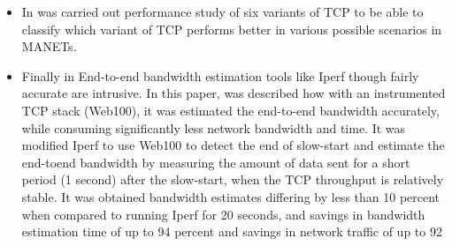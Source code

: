 {\begin{itemize}
\item In \cite{ee} was carried out performance study of six variants of TCP to be able to classify which variant of TCP performs better in various possible scenarios in MANETs.
\item Finally in \cite{ff} End-to-end bandwidth estimation tools like Iperf though fairly accurate are intrusive. In this paper, was described how with an instrumented TCP stack (Web100), it was estimated the end-to-end bandwidth accurately, while consuming significantly less network bandwidth and time. It was modified Iperf to use Web100 to detect the end of slow-start and estimate the end-toend bandwidth by measuring the amount of data sent for a short period (1 second) after the slow-start, when the TCP throughput is relatively stable. It was obtained bandwidth estimates differing by less than 10 percent when compared to running Iperf for 20 seconds, and savings in bandwidth estimation time of up to 94 percent and savings in network traffic of up to 92%
\end{itemize}
}
